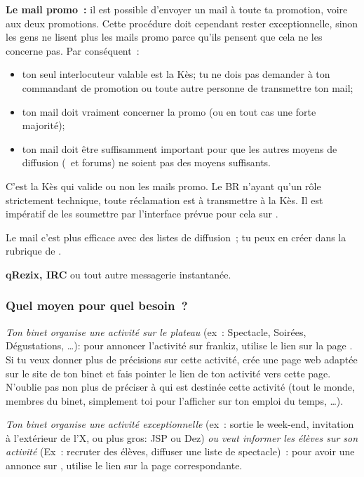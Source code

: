 \textbf{Le mail promo~:} il est possible d'envoyer un mail à toute
ta promotion, voire aux deux promotions. Cette procédure doit
cependant rester exceptionnelle, sinon les gens ne lisent plus les
mails promo parce qu'ils pensent que cela ne les concerne pas. Par
conséquent~:
\begin{itemize}
  \item ton seul interlocuteur valable est la Kès; tu ne dois pas demander à ton commandant de promotion
        ou toute autre personne de transmettre ton mail;
  \item ton mail doit vraiment concerner la promo (ou en tout cas une forte majorité);
  \item ton mail doit être suffisamment important pour que les autres moyens de diffusion (\fkz\ et forums) ne soient pas des moyens suffisants.
\end{itemize}
C'est la Kès qui valide ou non les mails promo. Le BR n'ayant qu'un rôle strictement technique, toute réclamation est à transmettre à la Kès. Il est
impératif de les soumettre par l'interface prévue pour cela sur \fkz.

  Le mail c'est plus efficace avec des listes de diffusion~; tu peux en créer dans la rubrique  de .

\textbf{qRezix, IRC} ou tout autre messagerie instantanée.

\subsubsection{Quel moyen pour quel besoin~?}
\emph{Ton binet organise une activité sur le plateau} (ex~: Spectacle,
Soirées, Dégustations, \dots): pour annoncer l'activité sur frankiz, utilise
le lien  sur la page . Si tu veux donner plus de
précisions sur cette activité, crée une page web adaptée sur le site
de ton binet et fais pointer le lien de ton activité vers cette
page. N'oublie pas non plus de pr\'eciser \`a qui est destin\'ee cette activit\'e (tout le monde, membres du binet, simplement toi pour l'afficher sur ton emploi du temps, \dots).

\emph{Ton binet organise une activité exceptionnelle} (ex~: sortie le week-end, invitation à l'extérieur de l'X, ou plus gros: JSP ou Dez)
\emph{ou veut informer les élèves sur son activité} (Ex~: recruter des élèves, diffuser une liste de spectacle)~: pour avoir une annonce sur \fkz, utilise le lien  sur la page correspondante.

